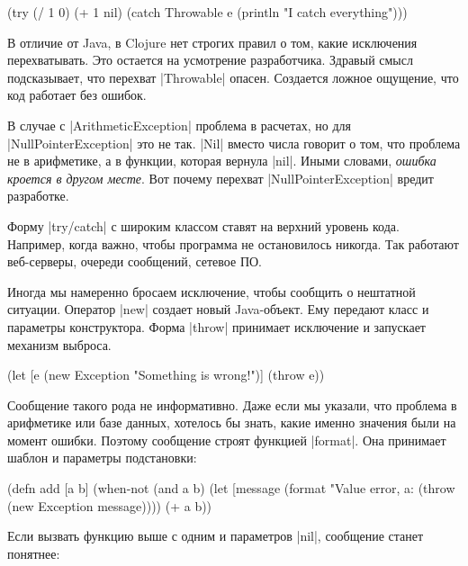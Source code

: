 \begin{english}
  \begin{clojure}
(try
  (/ 1 0)
  (+ 1 nil)
  (catch Throwable e
    (println "I catch everything")))
  \end{clojure}
\end{english}

В отличие от Java, в Clojure нет строгих правил о том, какие исключения
перехватывать. Это остается на усмотрение разработчика. Здравый смысл
подсказывает, что перехват \spverb|Throwable| опасен. Создается ложное ощущение,
что код работает без ошибок.

В случае с \spverb|ArithmeticException| проблема в расчетах, но для
\spverb|NullPointerException| это не так. \spverb|Nil| вместо числа говорит о
том, что проблема не в арифметике, а в функции, которая вернула
\spverb|nil|. Иными словами, \emph{ошибка кроется в другом месте}. Вот почему
перехват \spverb|NullPointerException| вредит разработке.

Форму \spverb|try/catch| с широким классом ставят на верхний уровень
кода. Например, когда важно, чтобы программа не остановилось никогда. Так
работают веб-серверы, очереди сообщений, сетевое ПО.

Иногда мы намеренно бросаем исключение, чтобы сообщить о нештатной
ситуации. Оператор \spverb|new| создает новый Java-объект. Ему передают класс и
параметры конструктора. Форма \spverb|throw| принимает исключение и запускает
механизм выброса.

\begin{english}
  \begin{clojure}
(let [e (new Exception "Something is wrong!")]
  (throw e))
  \end{clojure}
\end{english}

Сообщение такого рода не информативно. Даже если мы указали, что проблема в
арифметике или базе данных, хотелось бы знать, какие именно значения были на
момент ошибки. Поэтому сообщение строят функцией \spverb|format|. Она принимает
шаблон и параметры подстановки:

\begin{english}
  \begin{clojure}
(defn add [a b]
  (when-not (and a b)
    (let [message (format "Value error, a: %
      (throw (new Exception message))))
  (+ a b))
  \end{clojure}
\end{english}

\noindent
Если вызвать функцию выше с одним и параметров \spverb|nil|, сообщение станет
понятнее:

